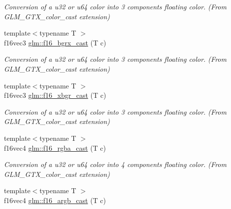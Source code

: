\begin{DoxyCompactItemize}
\begin{DoxyCompactList}\small\item\em Conversion of a u32 or u64 color into 3 components floating color. (From G\+L\+M\+\_\+\+G\+T\+X\+\_\+color\+\_\+cast extension) \end{DoxyCompactList}\item 
\hypertarget{group__gtx__color__cast_ga5d0d73e114e2fc072f7e7fbabd72b511}{}{\footnotesize template$<$typename T $>$ }\\f16vec3 \hyperlink{group__gtx__color__cast_ga5d0d73e114e2fc072f7e7fbabd72b511}{glm\+::f16\+\_\+bgrx\+\_\+cast} (T c)\label{group__gtx__color__cast_ga5d0d73e114e2fc072f7e7fbabd72b511}

\begin{DoxyCompactList}\small\item\em Conversion of a u32 or u64 color into 3 components floating color. (From G\+L\+M\+\_\+\+G\+T\+X\+\_\+color\+\_\+cast extension) \end{DoxyCompactList}\item 
\hypertarget{group__gtx__color__cast_gafbeb919e45ff901eaec92a130cc82857}{}{\footnotesize template$<$typename T $>$ }\\f16vec3 \hyperlink{group__gtx__color__cast_gafbeb919e45ff901eaec92a130cc82857}{glm\+::f16\+\_\+xbgr\+\_\+cast} (T c)\label{group__gtx__color__cast_gafbeb919e45ff901eaec92a130cc82857}

\begin{DoxyCompactList}\small\item\em Conversion of a u32 or u64 color into 3 components floating color. (From G\+L\+M\+\_\+\+G\+T\+X\+\_\+color\+\_\+cast extension) \end{DoxyCompactList}\item 
\hypertarget{group__gtx__color__cast_gaa777898269e22a5061651ef973cf07b7}{}{\footnotesize template$<$typename T $>$ }\\f16vec4 \hyperlink{group__gtx__color__cast_gaa777898269e22a5061651ef973cf07b7}{glm\+::f16\+\_\+rgba\+\_\+cast} (T c)\label{group__gtx__color__cast_gaa777898269e22a5061651ef973cf07b7}

\begin{DoxyCompactList}\small\item\em Conversion of a u32 or u64 color into 4 components floating color. (From G\+L\+M\+\_\+\+G\+T\+X\+\_\+color\+\_\+cast extension) \end{DoxyCompactList}\item 
\hypertarget{group__gtx__color__cast_ga108db09da79d5a9c91f2cbd5f2b3f34c}{}{\footnotesize template$<$typename T $>$ }\\f16vec4 \hyperlink{group__gtx__color__cast_ga108db09da79d5a9c91f2cbd5f2b3f34c}{glm\+::f16\+\_\+argb\+\_\+cast} (T c)\label{group__gtx__color__cast_ga108db09da79d5a9c91f2cbd5f2b3f34c}


\end{DoxyCompactItemize}
